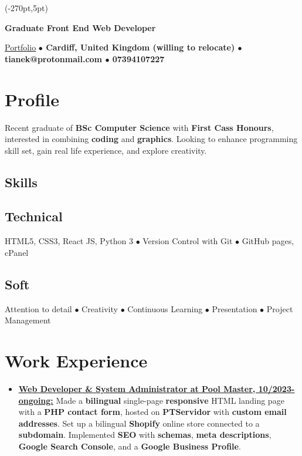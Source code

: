 \documentclass[11pt]{article}
\makeatletter
\newcommand{\verticalline}[1][1pt]{\rule[-0.35ex]{#1}{0.9em}}
\renewcommand{\maketitle}{
\begin{center}
    {\huge\bfseries
    \theauthor \hspace{0.5em}{\verticalline[1.5pt]}\hspace{0.5em}Graduate Front End Web Developer} 

    \vspace{0.7em}

    \ulink{https://orbit-9j.github.io/Portfolio/}{Portfolio} 
    \textbf{$\bullet$  Cardiff, United Kingdom (willing to relocate) $\bullet$ tianek@protonmail.com  $\bullet$ 07394107227}
\end{center}
}
\newcommand{\ulink}[2]{\href{#1}{\uline{#2}}}
\makeatother
\begin{document}
\begin{textblock*}{\paperwidth}(-270pt,5pt)
    \hspace*{\fill}
\end{textblock*}
\vspace*{-0.8cm}
    \author{Rin Tian}
    \maketitle

    \section{Profile}
    Recent graduate of \textbf{BSc Computer Science} with \textbf{First Cass Honours}, interested in combining \textbf{coding} and \textbf{graphics}. Looking to enhance programming skill set, gain real life experience, and explore creativity. 

    \begin{center}
        \section{Skills} 
        \subsection{Technical}
    HTML5, CSS3, React JS, Python 3 $\bullet$ Version Control with Git $\bullet$ GitHub pages, cPanel 
        
        \subsection{Soft}Attention to detail $\bullet$ Creativity $\bullet$ Continuous Learning $\bullet$
        Presentation $\bullet$ Project Management
    \end{center}
   
    \section{Work Experience}
    \begin{itemize}[itemsep=3pt, leftmargin=1em]
        \item \ulink{https://poolmaster.pt/} {\textbf{Web Developer \& System Administrator at Pool Master, 10/2023-ongoing:}} Made a \textbf{bilingual} single-page \textbf{responsive} HTML landing page with a \textbf{PHP contact form}, hosted on \textbf{PTServidor} with \textbf{custom email addresses}. Set up a bilingual \textbf{Shopify} online store connected to a \textbf{subdomain}. Implemented \textbf{SEO} with \textbf{schemas}, \textbf{meta descriptions}, \textbf{Google Search Console}, and a \textbf{Google Business Profile}.
    \end{itemize}
\end{document}
